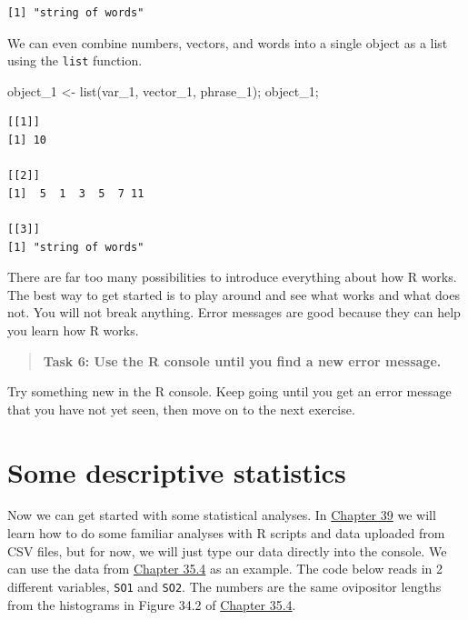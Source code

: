 \documentclass[
]{scrbook}
\newenvironment{Shaded}{\begin{snugshade}}{\end{snugshade}}
\newcommand{\FunctionTok}[1]{\textcolor[rgb]{0.00,0.00,0.00}{#1}}
\newcommand{\NormalTok}[1]{#1}
\newcommand{\OtherTok}[1]{\textcolor[rgb]{0.56,0.35,0.01}{#1}}
\begin{document}
\begin{verbatim}
[1] "string of words"
\end{verbatim}

We can even combine numbers, vectors, and words into a single object as a list using the \texttt{list} function.

\begin{Shaded}
\begin{Highlighting}[]
\NormalTok{object\_1 }\OtherTok{\textless{}{-}} \FunctionTok{list}\NormalTok{(var\_1, vector\_1, phrase\_1);}
\NormalTok{object\_1;}
\end{Highlighting}
\end{Shaded}

\begin{verbatim}
[[1]]
[1] 10

[[2]]
[1]  5  1  3  5  7 11

[[3]]
[1] "string of words"
\end{verbatim}

There are far too many possibilities to introduce everything about how R works.
The best way to get started is to play around and see what works and what does not.
You will not break anything.
Error messages are good because they can help you learn how R works.

\begin{quote}
\textbf{Task 6: Use the R console until you find a new error message.}
\end{quote}

Try something new in the R console.
Keep going until you get an error message that you have not yet seen, then move on to the next exercise.

\hypertarget{some-descriptive-statistics}{%
\section{Some descriptive statistics}\label{some-descriptive-statistics}}

Now we can get started with some statistical analyses.
In \protect\hyperlink{Chapter_39}{Chapter 39} we will learn how to do some familiar analyses with R scripts and data uploaded from CSV files, but for now, we will just type our data directly into the console.
We can use the data from \protect\hyperlink{randomisation-for-hypothesis-testing}{Chapter 35.4} as an example.
The code below reads in 2 different variables, \texttt{SO1} and \texttt{SO2}.
The numbers are the same ovipositor lengths from the histograms in Figure 34.2 of \protect\hyperlink{randomisation-for-hypothesis-testing}{Chapter 35.4}.
\end{document}
